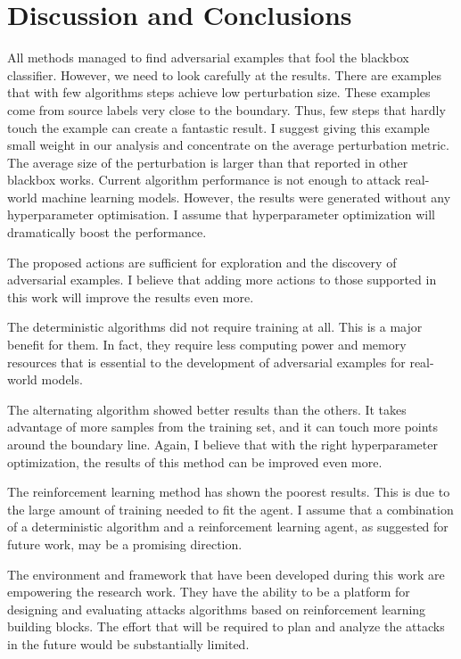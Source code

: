 \documentclass{article}
\begin{document}
\section{Discussion and Conclusions}
All methods managed to find adversarial examples that fool the blackbox classifier. However, we need to look carefully at the results. There are examples that with few algorithms steps achieve low perturbation size. These examples come from source labels very close to the boundary. Thus, few steps that hardly touch the example can create a fantastic result. I suggest giving this example small weight in our analysis and concentrate on the average perturbation metric. \\

The average size of the perturbation is larger than that reported in other blackbox works. Current algorithm performance is not enough to attack real-world machine learning models. However, the results were generated without any hyperparameter optimisation. I assume that hyperparameter optimization will dramatically boost the performance. 

The proposed actions are sufficient for exploration and the discovery of adversarial examples. I believe that adding more actions to those supported in this work will improve the results even more. 

The deterministic algorithms did not require training at all. This is a major benefit for them. In fact, they require less computing power and memory resources that is essential to the development of adversarial examples for real-world models.

The alternating algorithm showed better results than the others. It takes advantage of more samples from the training set, and it can touch more points around the boundary line. Again, I believe that with the right hyperparameter optimization, the results of this method can be improved even more.

The reinforcement learning method has shown the poorest results. This is due to the large amount of training needed to fit the agent. I assume that a combination of a deterministic algorithm and a reinforcement learning agent, as suggested for future work, may be a promising direction.

The environment and framework that have been developed during this work are empowering the research work. They have the ability to be a platform for designing and evaluating attacks algorithms based on reinforcement learning building blocks. The effort that will be required to plan and analyze the attacks in the future would be substantially limited. 
\end{document}
